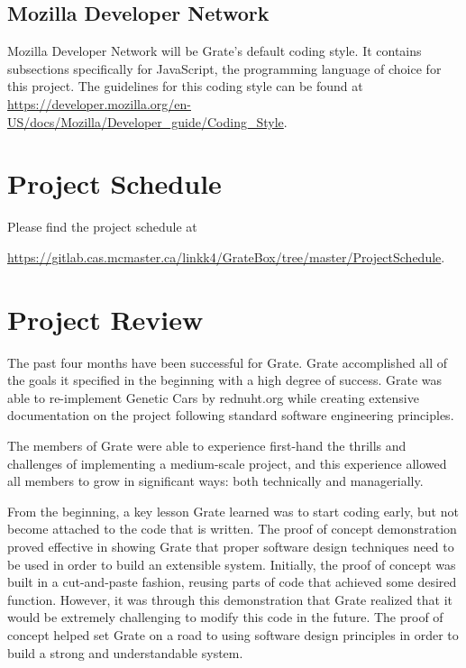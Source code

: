 \documentclass{article}
\begin{document}
\subsection{Mozilla Developer Network}

Mozilla Developer Network will be \textcolor{RoyalPurple}{Grate's} default 
coding style. It contains 
subsections specifically for JavaScript, the programming language of choice for 
this project.  The guidelines for this coding style can be found at
\url{https://developer.mozilla.org/en-US/docs/Mozilla/Developer\_guide/Coding\_Style}.

\section{Project Schedule}
Please find the project schedule at 

\url{https://gitlab.cas.mcmaster.ca/linkk4/GrateBox/tree/master/ProjectSchedule}.

\section{Project Review}
\textcolor{RoyalPurple}{The past four months have been successful for Grate. 
Grate 
accomplished all of 
the goals it specified in the beginning with a high degree of success. Grate was 
able to re-implement Genetic Cars by rednuht.org while creating extensive 
documentation on the project following standard software engineering 
principles.}

\textcolor{RoyalPurple}{The members of Grate were able to experience first-hand 
the 
thrills and 
challenges of implementing a medium-scale project, and this experience allowed 
all members to grow in significant ways: both technically and managerially. }

\textcolor{RoyalPurple}{From the beginning, a key lesson Grate learned was to 
start 
coding early, but 
not become attached to the code that is written. The proof of concept 
demonstration proved effective in showing Grate that proper software design 
techniques need to be used in order to build an extensible system. Initially, 
the proof of concept was built in a cut-and-paste fashion, reusing parts of code 
that achieved some desired function. However, it was through this demonstration 
that Grate realized that it would be extremely challenging to modify this code 
in the future. The proof of concept helped set Grate on a road to using software 
design principles in order to build a strong and understandable system.}
\end{document}
